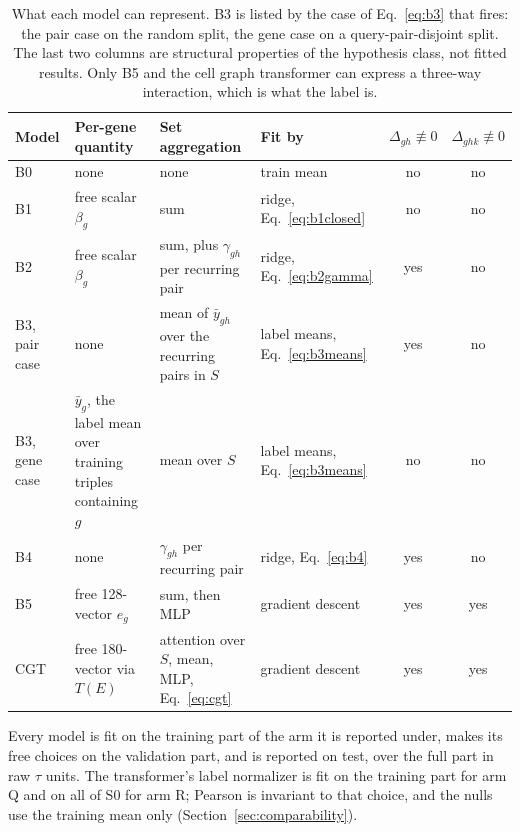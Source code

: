 \begin{table}[htbp]
\centering
\footnotesize
\caption{What each model can represent. B3 is listed by the case of Eq.~\ref{eq:b3}
that fires: the pair case on the random split, the gene case on a
query-pair-disjoint split. The last two columns are structural properties of the
hypothesis class, not fitted results. Only B5 and the cell graph transformer can
express a three-way interaction, which is what the label is.}
\label{tab:capacity}
\begin{tabular}{lp{}p{}lcc}
\toprule
Model & Per-gene quantity & Set aggregation & Fit by & $\Delta_{gh} \not\equiv 0$ & $\Delta_{ghk} \not\equiv 0$ \\
\midrule
B0 & none & none & train mean & no & no \\
B1 & free scalar $\beta_g$ & sum & ridge, Eq.~\ref{eq:b1closed} & no & no \\
B2 & free scalar $\beta_g$ & sum, plus $\gamma_{gh}$ per recurring pair & ridge, Eq.~\ref{eq:b2gamma} & yes & no \\
B3, pair case & none & mean of $\bar{y}_{gh}$ over the recurring pairs in $S$ & label means, Eq.~\ref{eq:b3means} & yes & no \\
B3, gene case & $\bar{y}_g$, the label mean over training triples containing $g$ & mean over $S$ & label means, Eq.~\ref{eq:b3means} & no & no \\
B4 & none & $\gamma_{gh}$ per recurring pair & ridge, Eq.~\ref{eq:b4} & yes & no \\
B5 & free 128-vector $e_g$ & sum, then MLP & gradient descent & yes & yes \\
CGT & free 180-vector via $T(E)$ & attention over $S$, mean, MLP, Eq.~\ref{eq:cgt} & gradient descent & yes & yes \\
\bottomrule
\end{tabular}
\end{table}

Every model is fit on the training part of the arm it is reported under, makes its
free choices on the validation part, and is reported on test, over the full part in
raw $\tau$ units. The transformer's label normalizer is fit on the training part for
arm Q and on all of S0 for arm R; Pearson is invariant to that choice, and the
nulls use the training mean only\iflong{} (Section~\ref{sec:comparability})\fi.
